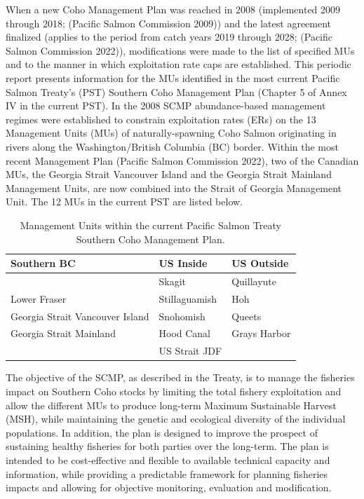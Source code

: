 \documentclass[
  letterpaper,
  DIV=11,
  numbers=noendperiod]{scrartcl}
\begin{document}
When a new Coho Management Plan was reached in 2008 (implemented 2009
through 2018; (Pacific Salmon Commission 2009)) and the latest agreement
finalized (applies to the period from catch years 2019 through 2028;
(Pacific Salmon Commission 2022)), modifications were made to the list
of specified MUs and to the manner in which exploitation rate caps are
established. This periodic report presents information for the MUs
identified in the most current Pacific Salmon Treaty's (PST) Southern
Coho Management Plan (Chapter 5 of Annex IV in the current PST). In the
2008 SCMP abundance-based management regimes were established to
constrain exploitation rates (ERs) on the 13 Management Units (MUs) of
naturally-spawning Coho Salmon originating in rivers along the
Washington/British Columbia (BC) border. Within the most recent
Management Plan (Pacific Salmon Commission 2022), two of the Canadian
MUs, the Georgia Strait Vancouver Island and the Georgia Strait Mainland
Management Units, are now combined into the Strait of Georgia Management
Unit. The 12 MUs in the current PST are listed below.

\begin{table}
\caption*{
{\large Management Units within the current Pacific Salmon Treaty Southern Coho Management Plan.}
} 
\fontsize{12.0pt}{14.4pt}\selectfont
\begin{tabular*}{300pt}{@{\extracolsep{\fill}}lll}
\toprule
{\bfseries Southern BC} & {\bfseries US Inside} & {\bfseries US Outside} \\ 
\midrule\addlinespace[2.5pt]
{Interior Fraser} & {Skagit} & {Quillayute} \\ 
{Lower Fraser} & {Stillaguamish} & {Hoh} \\ 
{Georgia Strait Vancouver Island} & {Snohomish} & {Queets} \\ 
{Georgia Strait Mainland} & {Hood Canal} & {Grays Harbor} \\ 
{} & {US Strait JDF} & {} \\ 
\bottomrule
\end{tabular*}
\end{table}

The objective of the SCMP, as described in the Treaty, is to manage the
fisheries impact on Southern Coho stocks by limiting the total fishery
exploitation and allow the different MUs to produce long-term Maximum
Sustainable Harvest (MSH), while maintaining the genetic and ecological
diversity of the individual populations. In addition, the plan is
designed to improve the prospect of sustaining healthy fisheries for
both parties over the long-term. The plan is intended to be
cost-effective and flexible to available technical capacity and
information, while providing a predictable framework for planning
fisheries impacts and allowing for objective monitoring, evaluation and
modification.
\end{document}
